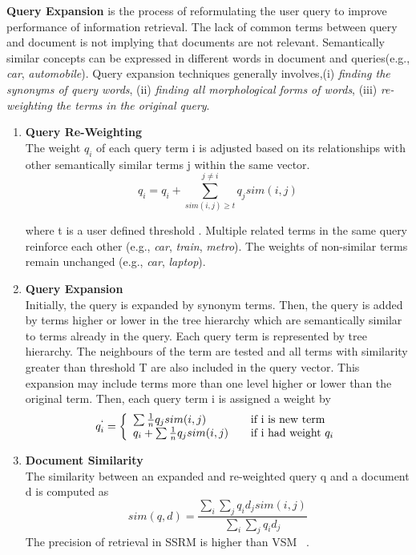 \textbf{Query Expansion} is the process of reformulating the user query to improve performance of information retrieval. The lack of common terms between query and document is not implying that documents are not relevant. Semantically similar concepts can be expressed in different words in document and queries(e.g., \textit{car}, \textit{automobile}). Query expansion techniques generally involves,(i) \textit{finding the synonyms of query words}, (ii) \textit{finding all morphological forms of words}, (iii) \textit{re-weighting the terms in the original query}.

\begin{enumerate}
\item{\textbf{Query Re-Weighting}} \\
The weight $q_i$ of each query term i is adjusted based on its relationships with other semantically similar terms j within the same vector.
\begin{equation}
q_i = q_i + \sum_{sim(i,j) \geq t}^{j \neq i} q_j sim(i,j) 
\end{equation}

where t is a user defined threshold . Multiple related terms in the same
query reinforce each other (e.g., \textit{car}, \textit{train}, \textit{metro}). The weights of non-similar terms remain unchanged (e.g., \textit{car}, \textit{laptop}).

\item{\textbf{Query Expansion}}\\
Initially, the query is expanded by synonym terms. Then, the query is added by terms higher or lower in the tree hierarchy which are semantically similar to terms already in the query. Each query term is represented by tree hierarchy. The neighbours of the term are tested and all terms with similarity greater than threshold T are also included in the query vector. This expansion may include terms more than one level higher or lower than the original term. Then, each query term i is assigned a weight by
	\[q_i^` = \left\{ 
	\begin{array}{l l}
	  \sum \frac{1}{n} q_j sim(i,j) & \quad \mbox{if i is new term}\\
	  q_i + \sum \frac{1}{n} q_j sim(i,j) & \quad \mbox{if i had weight $q_i$}\\ \end{array} \right. \]


\item{\textbf{Document Similarity}} \\
The similarity between an expanded and re-weighted query q and a document d is computed as
		\begin{equation}
		sim(q,d) = \frac{\sum_i \sum_j q_i d_j sim(i,j)}{\sum_i \sum_j q_i d_j}
		\end{equation}
The precision of retrieval in SSRM is higher than VSM ~\citep{hliaoutakis2006information}.  

\end{enumerate}

